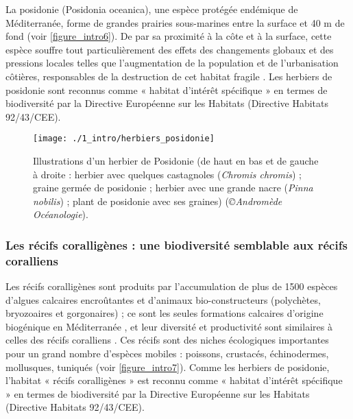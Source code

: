 La posidonie (Posidonia oceanica), une espèce protégée endémique de Méditerranée, forme de grandes prairies sous-marines entre la surface et 40 m de fond (voir \autoref{figure_intro6}). De par sa proximité à la côte et à la surface, cette espèce souffre tout particulièrement des effets des changements globaux \citep{marba_mediterranean_2014} et des pressions locales telles que l’augmentation de la population et de l’urbanisation côtières, responsables de la destruction de cet habitat fragile \citep{montefalcone_human_2010, marba_mediterranean_2014, holon_impact_2015, telesca_seagrass_2015}. Les herbiers de posidonie sont reconnus comme « habitat d’intérêt spécifique » en termes de biodiversité par la Directive Européenne sur les Habitats (Directive Habitats 92/43/CEE).

\begin{figure}[H]
	\begin{center}
	\texttt{[image: ./1\_intro/herbiers\_posidonie]}
		\caption[Illustrations d’un herbier de Posidonie]{Illustrations d’un herbier de Posidonie (de haut en bas et de gauche à droite : herbier avec quelques castagnoles (\textit{Chromis chromis}) ; graine germée de posidonie ; herbier avec une grande nacre (\textit{Pinna nobilis}) ; plant de posidonie avec ses graines) (\textit{©Andromède Océanologie}).}
	\label{figure_intro6}
\end{center}
\end{figure}

\subsubsection{Les récifs coralligènes : une biodiversité semblable aux récifs coralliens}\label{intro.1.3.2}

Les récifs coralligènes sont produits par l’accumulation de plus de 1500 espèces d’algues calcaires encroûtantes et d’animaux bio-constructeurs (polychètes, bryozoaires et gorgonaires)  \citep{ballesteros_mediterranean_2006}; ce sont les seules formations calcaires d’origine biogénique en Méditerranée \citep{ballesteros_mediterranean_2006}, et leur diversité et productivité sont similaires à celles des récifs coralliens \citep{bianchi_biocostruzione_2001}. Ces récifs sont des niches écologiques importantes pour un grand nombre d’espèces mobiles : poissons, crustacés, échinodermes, mollusques, tuniqués \citep{ballesteros_mediterranean_2006} (voir \autoref{figure_intro7}). Comme les herbiers de posidonie, l’habitat « récifs coralligènes » est reconnu comme « habitat d’intérêt spécifique » en termes de biodiversité par la Directive Européenne sur les Habitats (Directive Habitats 92/43/CEE).

